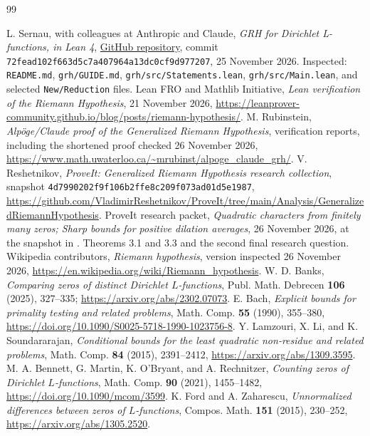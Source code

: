 \documentclass[11pt,letterpaper]{article}
\theoremstyle{definition}\newtheorem{definition}[theorem]{Definition}
\theoremstyle{remark}\newtheorem{remark}[theorem]{Remark}
\begin{document}
\clearpage
{}
\begin{thebibliography}{99}
\raggedright
{} L. Sernau, with colleagues at Anthropic and Claude,
\emph{GRH for Dirichlet L-functions, in Lean 4},
\href{https://github.com/lsernau/grh-lean}{GitHub repository},
commit \texttt{72fead102f663d5c7a407964a13dc0cf9d977207}, 25 November 2026.
Inspected: \texttt{README.md}, \texttt{grh/GUIDE.md},
\texttt{grh/src/Statements.lean}, \texttt{grh/src/Main.lean}, and selected
\texttt{New/Reduction} files.
 Lean FRO and Mathlib Initiative,
\emph{Lean verification of the Riemann Hypothesis}, 21 November 2026,
\url{https://leanprover-community.github.io/blog/posts/riemann-hypothesis/}.
 M. Rubinstein,
\emph{Alp\"oge/Claude proof of the Generalized Riemann Hypothesis},
verification reports, including the shortened proof checked 26 November 2026,
\url{https://www.math.uwaterloo.ca/~mrubinst/alpoge_claude_grh/}.
 V. Reshetnikov, \emph{ProveIt: Generalized Riemann
Hypothesis research collection}, snapshot
\texttt{4d7990202f9f106b2ffe8c209f073ad01d5e1987},
\url{https://github.com/VladimirReshetnikov/ProveIt/tree/main/Analysis/GeneralizedRiemannHypothesis}.
 ProveIt research packet,
\emph{Quadratic characters from finitely many zeros; Sharp bounds for
positive dilation averages}, 26 November 2026,
at the snapshot in
\cite{proveit}. Theorems 3.1 and 3.3 and the second final research question.
 Wikipedia contributors, \emph{Riemann hypothesis},
version inspected 26 November 2026,
\url{https://en.wikipedia.org/wiki/Riemann_hypothesis}.
 W. D. Banks, \emph{Comparing zeros of distinct Dirichlet
$L$-functions}, Publ. Math. Debrecen \textbf{106} (2025), 327--335;
\url{https://arxiv.org/abs/2302.07073}.
 E. Bach, \emph{Explicit bounds for primality testing and
related problems}, Math. Comp. \textbf{55} (1990), 355--380,
\url{https://doi.org/10.1090/S0025-5718-1990-1023756-8}.
 Y. Lamzouri, X. Li, and K. Soundararajan,
\emph{Conditional bounds for the least quadratic non-residue and
related problems}, Math. Comp. \textbf{84} (2015), 2391--2412,
\url{https://arxiv.org/abs/1309.3595}.
 M. A. Bennett, G. Martin, K. O'Bryant, and A. Rechnitzer,
\emph{Counting zeros of Dirichlet $L$-functions}, Math. Comp.
\textbf{90} (2021), 1455--1482,
\url{https://doi.org/10.1090/mcom/3599}.
 K. Ford and A. Zaharescu,
\emph{Unnormalized differences between zeros of $L$-functions},
Compos. Math. \textbf{151} (2015), 230--252,
\url{https://arxiv.org/abs/1305.2520}.
\end{thebibliography}
\end{document}
